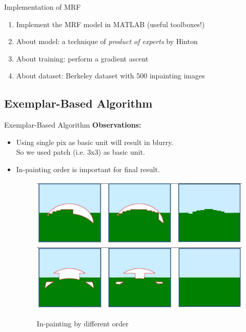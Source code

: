 \documentclass{beamer}
\begin{document}
\begin{frame}{Implementation of MRF}
\begin{enumerate}
\item Implement the MRF model in MATLAB (useful toolboxes!)
\item About model: a technique of \emph{product of experts} by Hinton
\item About training: perform a gradient ascent
\item About dataset: Berkeley dataset with 500 inpainting images
\end{enumerate}
\end{frame}

\subsection{Exemplar-Based Algorithm}
\begin{frame}{Exemplar-Based Algorithm}
	\textbf{Observations:}
	\begin{itemize}[<+->]
		\item Using single pix as basic unit will result in blurry. \\So we used patch (i.e. 3x3) as basic unit.
		\item In-painting order is important for final result. 
		\begin{figure}
			\centering
			\includegraphics[width=0.8\linewidth]{order1.png}\\
			\includegraphics[width=0.8\linewidth]{order2.png}
			\caption{In-painting by different order}
		\end{figure}
	\end{itemize}
\end{frame}
%
\end{document}
